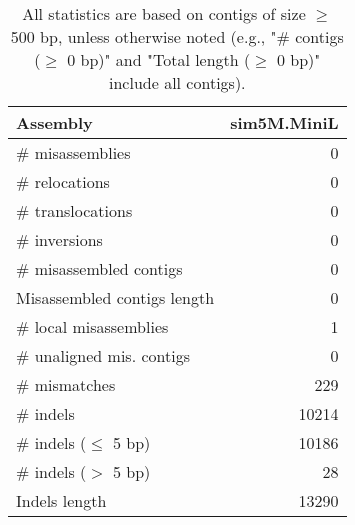 \documentclass[12pt,a4paper]{article}
\begin{document}
\begin{table}[ht]
\begin{center}
\caption{All statistics are based on contigs of size $\geq$ 500 bp, unless otherwise noted (e.g., "\# contigs ($\geq$ 0 bp)" and "Total length ($\geq$ 0 bp)" include all contigs).}
\begin{tabular}{|l*{1}{|r}|}
\hline
Assembly & sim5M.MiniL \\ \hline
\# misassemblies & 0 \\ \hline
\hspace{5mm}\# relocations & 0 \\ \hline
\hspace{5mm}\# translocations & 0 \\ \hline
\hspace{5mm}\# inversions & 0 \\ \hline
\# misassembled contigs & 0 \\ \hline
Misassembled contigs length & 0 \\ \hline
\# local misassemblies & 1 \\ \hline
\# unaligned mis. contigs & 0 \\ \hline
\# mismatches & 229 \\ \hline
\# indels & 10214 \\ \hline
\hspace{5mm}\# indels ($\leq$ 5 bp) & 10186 \\ \hline
\hspace{5mm}\# indels ($>$ 5 bp) & 28 \\ \hline
Indels length & 13290 \\ \hline
\end{tabular}
\end{center}
\end{table}
\end{document}
